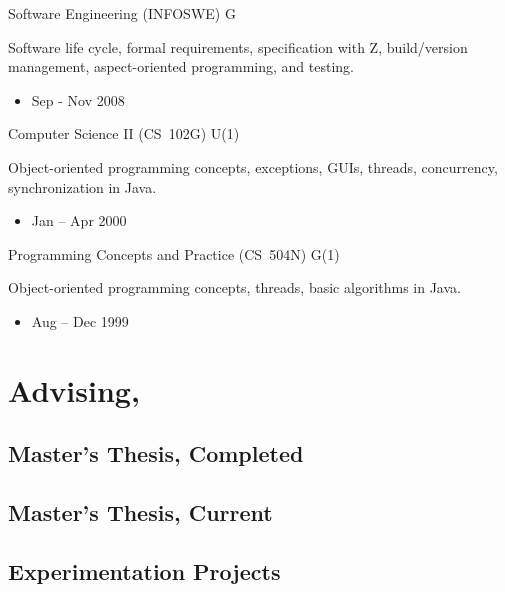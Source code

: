 \documentclass[11pt,a4paper,roman]{moderncv}
\begin{document}
\cventry%
{}%
{Software Engineering (INFOSWE)}%
{\uu}%
{}%
{G}%
{Software life cycle, formal requirements, specification with Z, build/version management, aspect-oriented programming, and testing.
\begin{itemize}
\item Sep - Nov 2008
\end{itemize}}

\cventry%
{}%
{Computer Science II (CS~102G)}%
{\wustl}%
{}%
{U(1)}%
{Object-oriented programming concepts, exceptions, GUIs, threads, concurrency, synchronization in Java.
\begin{itemize}
\item Jan -- Apr 2000
\end{itemize}}

\cventry%
{}%
{Programming Concepts and Practice (CS~504N)}%
{\wustl}%
{}%
{G(1)}%
{Object-oriented programming concepts, threads, basic algorithms in Java.
\begin{itemize}
\item Aug -- Dec 1999
\end{itemize}}


\section{Advising, \uu}

\subsection{Master's Thesis, Completed}


\subsection{Master's Thesis, Current}


\subsection{Experimentation Projects}
\end{document}

